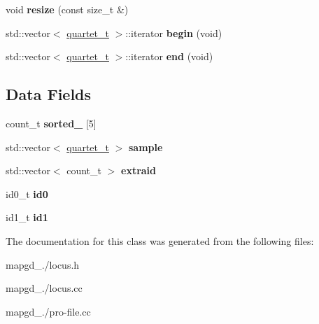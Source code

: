 \begin{DoxyCompactItemize}
\item 
\hypertarget{classLocus_a85e869e3bdd9ba809c603503ed61d751}{void {\bfseries resize} (const size\-\_\-t \&)}\label{classLocus_a85e869e3bdd9ba809c603503ed61d751}

\item 
\hypertarget{classLocus_a9856c2ea54476766af7557ebbba07d0a}{std\-::vector$<$ \hyperlink{structquartet}{quartet\-\_\-t} $>$\-::iterator {\bfseries begin} (void)}\label{classLocus_a9856c2ea54476766af7557ebbba07d0a}

\item 
\hypertarget{classLocus_a6758be06e066d09c6743ed5a0c49528b}{std\-::vector$<$ \hyperlink{structquartet}{quartet\-\_\-t} $>$\-::iterator {\bfseries end} (void)}\label{classLocus_a6758be06e066d09c6743ed5a0c49528b}

\end{DoxyCompactItemize}
\subsection*{Data Fields}
\begin{DoxyCompactItemize}
\item 
\hypertarget{classLocus_aa7e193d4069c91af62caf73cca14bb4a}{count\-\_\-t {\bfseries sorted\-\_\-} \mbox{[}5\mbox{]}}\label{classLocus_aa7e193d4069c91af62caf73cca14bb4a}

\item 
\hypertarget{classLocus_aa80d7ff11dd7cffa958016494084f102}{std\-::vector$<$ \hyperlink{structquartet}{quartet\-\_\-t} $>$ {\bfseries sample}}\label{classLocus_aa80d7ff11dd7cffa958016494084f102}

\item 
\hypertarget{classLocus_a585fb7981a75e033fd9d74f86e9f7914}{std\-::vector$<$ count\-\_\-t $>$ {\bfseries extraid}}\label{classLocus_a585fb7981a75e033fd9d74f86e9f7914}

\item 
\hypertarget{classLocus_a7cec04f75b93910372c2a3054164d3c6}{id0\-\_\-t {\bfseries id0}}\label{classLocus_a7cec04f75b93910372c2a3054164d3c6}

\item 
\hypertarget{classLocus_a57dd7a335166403e09fb750a002aa8ee}{id1\-\_\-t {\bfseries id1}}\label{classLocus_a57dd7a335166403e09fb750a002aa8ee}

\end{DoxyCompactItemize}


The documentation for this class was generated from the following files\-:\begin{DoxyCompactItemize}
\item 
mapgd\-\_./locus.\-h\item 
mapgd\-\_./locus.\-cc\item 
mapgd\-\_./pro-\/file.\-cc\end{DoxyCompactItemize}
